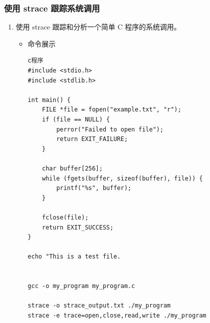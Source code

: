 \documentclass[UTF8]{ctexart}
\begin{document}
\subsubsection{使用 strace 跟踪系统调用}

\begin{enumerate}
  \item 使用 strace 跟踪和分析一个简单 C 程序的系统调用。
  \begin{itemize}
  \item 命令展示
  \begin{verbatim}
c程序
#include <stdio.h>
#include <stdlib.h>

int main() {
    FILE *file = fopen("example.txt", "r");
    if (file == NULL) {
        perror("Failed to open file");
        return EXIT_FAILURE;
    }

    char buffer[256];
    while (fgets(buffer, sizeof(buffer), file)) {
        printf("%s", buffer);
    }

    fclose(file);
    return EXIT_SUCCESS;
}

echo "This is a test file.


gcc -o my_program my_program.c

strace -o strace_output.txt ./my_program
strace -e trace=open,close,read,write ./my_program



\end{verbatim}
\end{itemize}
\end{enumerate}
\end{document}

